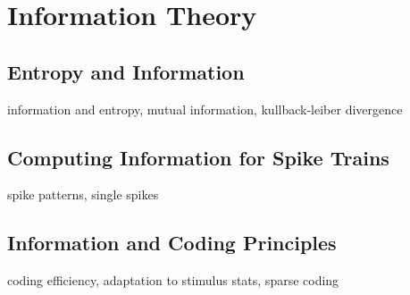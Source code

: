 \documentclass[11pt]{article}
\begin{document}
\newpage
\section{Information Theory}

\subsection{Entropy and Information}
information and entropy, mutual information, kullback-leiber divergence
\subsection{Computing Information for Spike Trains}
spike patterns, single spikes
\subsection{Information and Coding Principles}
coding efficiency, adaptation to stimulus stats, sparse coding
\end{document}
